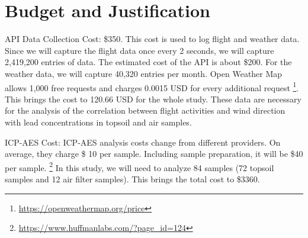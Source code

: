 \documentclass[12pt]{article}
\begin{document}
\section{Budget and Justification}
API Data Collection Cost: \$350. This cost is used to log flight and weather data. Since we will capture the flight data once every 2 seconds, we will capture 2,419,200 entries of data. The estimated cost of the API is about \$200. For the weather data, we will capture 40,320 entries per month. Open Weather Map allows 1,000 free requests and charges 0.0015 USD for every additional request \footnote{\url{https://openweathermap.org/price}}. This brings the cost to 120.66 USD for the whole study. These data are necessary for the analysis of the correlation between flight activities and wind direction with lead concentrations in topsoil and air samples. 

ICP-AES Cost:  ICP-AES analysis costs change from different providers. On average, they charge \$ 10 per sample. Including sample preparation, it will be \$40 per sample. \footnote{\url{https://www.huffmanlabs.com/?page_id=124}} In this study, we will need to analyze 84 samples (72 topsoil samples and 12 air filter samples). This brings the total cost to \$3360.
    

\newpage
\printbibliography
\end{document}
